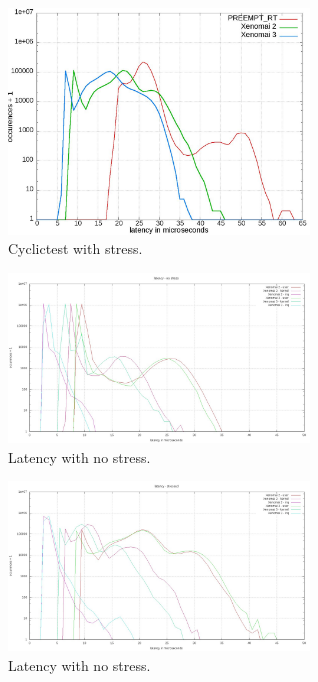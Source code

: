 \documentclass[10pt,a4paper]{article}
\begin{document}
\begin{multicols}{2}
\begin{figure}[H]
\begin{center}
\includegraphics[width=8cm]{img/cyclictest_stress.jpg}
\caption{Cyclictest with stress.}
\label{cyclictest-tress}
\end{center}
\end{figure}

\begin{figure}[H]
\begin{center}
\includegraphics[width=8cm]{img/latency_idle.jpg}
\caption{Latency with no stress.}
\label{latency-idle}
\end{center}
\end{figure}

\begin{figure}[H]
\begin{center}
\includegraphics[width=8cm]{img/latency_stress.jpg}
\caption{Latency with no stress.}
\label{latency-stress}
\end{center}
\end{figure}


\end{multicols}
\end{document}
